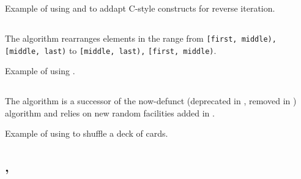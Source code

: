 \begin{box-note}
\footnotesize Example of using  and  to addapt C-style constructs for reverse iteration.
\tcblower
{}
\end{box-note}

\subsection{\texorpdfstring{}{\texttt{std::rotate}}}

The  algorithm rearranges elements in the range from \texttt{[first, middle),} \texttt{[middle, last)} to \texttt{[middle, last),} \texttt{[first, middle)}.


\begin{box-note}
\footnotesize Example of using .
\tcblower
{}
\end{box-note}

\subsection{\texorpdfstring{}{\texttt{std::shuffle}}}

The  algorithm is a successor of the now-defunct (deprecated in , removed in )  algorithm and relies on new random facilities added in .


\begin{box-note}
\footnotesize Example of using  to shuffle a deck of cards.
\tcblower
{}
\end{box-note}

\subsection{\texorpdfstring{, }{\texttt{std::next\_permutation}, \texttt{std::prev\_permutation}}}

